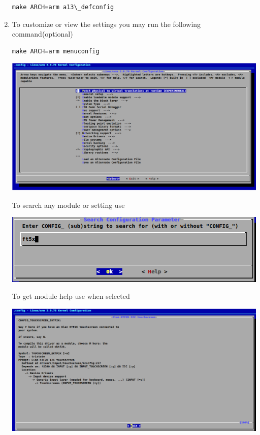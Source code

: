 \documentclass[letterpaper,10pt,english]{sphinxmanual}
\begin{document}
\begin{enumerate}
\begin{Verbatim}[commandchars=\\\{\}]
make ARCH=arm a13\_defconfig
\end{Verbatim}

\item {} 
To customize or view the settings you may run the following command(optional)

\begin{Verbatim}[commandchars=\\\{\}]
make ARCH=arm menuconfig
\end{Verbatim}

\includegraphics[width=1.000\linewidth]{menuconfig.png}

To search any module or setting use 

\includegraphics[width=1.000\linewidth]{search.png}

To get module help use  when selected

\includegraphics[width=1.000\linewidth]{module-help.png}


\end{enumerate}
\end{document}
